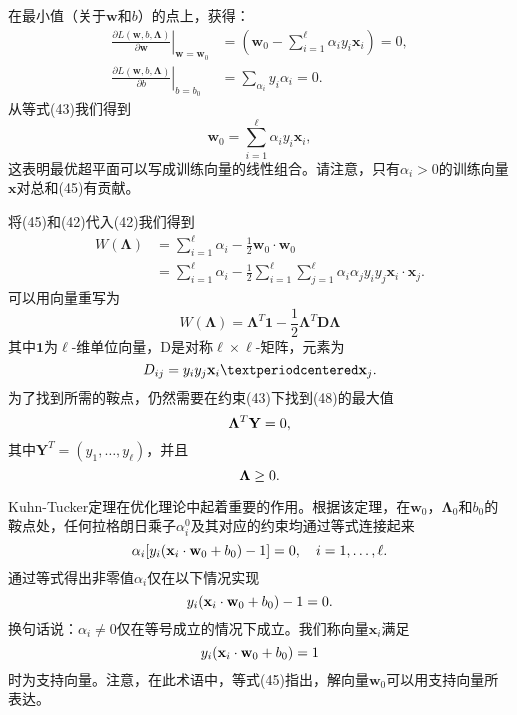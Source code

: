 \documentclass[lang=cn,11pt,a4paper]{elegantpaper}
\begin{document}
	在最小值（关于$\mathbf{w}$和$b$）的点上，获得：
	\begin{align}
		\left.\frac{\partial L(\mathbf{w},b,\mathbf{\Lambda})}{\partial \mathbf{w}}\right|_{\mathbf{w}=\mathbf{w}_0}&=\left(\mathbf{w}_0-\sum_{i=1}^\ell\alpha_iy_i\mathbf{x}_i \right)=0,\tag{43} \\
		\left.\frac{\partial L(\mathbf{w},b,\mathbf{\Lambda})}{\partial b}\right|_{b=b_0}&=\sum_{\alpha_i}y_i\alpha_i=0.\tag{44}
	\end{align}
	从等式(43)我们得到
	\begin{equation}
		\mathbf{w}_0=\sum_{i=1}^\ell \alpha_i y_i \mathbf{x}_i , \tag{45}
	\end{equation}
	这表明最优超平面可以写成训练向量的线性组合。请注意，只有$\alpha_i>0$的训练向量$\mathbf{x}$对总和(45)有贡献。

	将(45)和(42)代入(42)我们得到
	\begin{align}
		W(\mathbf{\Lambda}) &= \sum_{i=1}^{\ell} \alpha_i - \frac{1}{2} \mathbf{w}_0 \cdot \mathbf{w}_0 \tag{46} \\
		&= \sum_{i=1}^{\ell} \alpha_i - \frac{1}{2} \sum_{i=1}^{\ell} \sum_{j=1}^{\ell} \alpha_i \alpha_j y_i y_j \mathbf{x}_i \cdot \mathbf{x}_j . \tag{47}
	\end{align}
	可以用向量重写为
	\begin{equation}
		W(\mathbf{\Lambda})=\mathbf{\Lambda}^T\mathbf{1}-\frac{1}{2}\mathbf{\Lambda}^T\mathbf{D\Lambda}\tag{48}
	\end{equation}
	其中$\mathbf{1}$为$\ell$-维单位向量，D是对称$\ell\times\ell$-矩阵，元素为
	\begin{equation}
		D_{ij}=y_iy_j\mathbf{x}_i·\mathbf{x}_j.\notag
	\end{equation}
	为了找到所需的鞍点，仍然需要在约束(43)下找到(48)的最大值
	\begin{equation}
		\mathbf{\Lambda}^T\mathbf{Y}=0,\notag
	\end{equation}
	其中$\mathbf{Y}^T=(y_1,\dots,y_\ell)$，并且
	\begin{equation}
		\mathbf{\Lambda}\geq0.\notag
	\end{equation}

	Kuhn-Tucker定理在优化理论中起着重要的作用。根据该定理，在$\mathbf{w}_0$，$\mathbf{\Lambda}_0$和$b_0$的鞍点处，任何拉格朗日乘子$\alpha_i^0$及其对应的约束均通过等式连接起来
	\begin{equation}
		\alpha_i [ y_i ( \mathbf{x}_i \cdot \mathbf{w}_0 + b_0 ) - 1 ] = 0 , \quad i = 1 , \dots , \ell. \notag
	\end{equation}
	通过等式得出非零值$\alpha_i$仅在以下情况实现
	\begin{equation}
		y_i ( \mathbf{x}_i \cdot \mathbf{w}_0 + b_0 ) - 1 = 0. \notag
	\end{equation}
	换句话说：$\alpha_i \neq 0$仅在等号成立的情况下成立。我们称向量$\mathbf{x}_i$满足
	\begin{equation}
		y_i ( \mathbf{x}_i \cdot \mathbf{w}_0 + b_0 ) = 1 \notag
	\end{equation}
	时为支持向量。注意，在此术语中，等式(45)指出，解向量$\mathbf{w}_0$可以用支持向量所表达。
\end{document}
